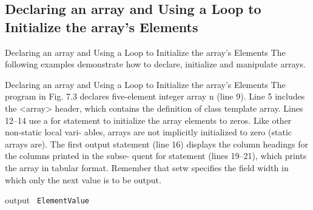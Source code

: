 \documentclass[10pt]{beamer}
\begin{document}
\subsection{Declaring an array and Using a Loop to Initialize the array’s Elements}
\begin{frame}{\footnotesize Declaring an array and Using a Loop to Initialize the array’s Elements}
	The following examples demonstrate how to declare, initialize and manipulate arrays.\\
	
	\begin{block}{\color{white}Declaring an array and Using a Loop to Initialize the array’s Elements}
		The program in Fig. 7.3 declares five-element integer array n (line 9). Line 5 includes the
		<array> header, which contains the definition of class template array. Lines 12–14 use a
		for statement to initialize the array elements to zeros. Like other non-static local vari-
		ables, arrays are not implicitly initialized to zero (static arrays are). The first output
		statement (line 16) displays the column headings for the columns printed in the subse-
		quent for statement (lines 19–21), which prints the array in tabular format. Remember
		that setw specifies the field width in which only the next value is to be output.
	\end{block}
\end{frame}

\begin{frame}{}
	
	\begin{block}{\color{white}output}
		\texttt{\scriptsize 
		Element\:\:\:Value\\
		\:\:\:\:\:\:\:\:\:\:\:\:\:\:\:\:\:\:\:\:\:\:\:\:\:\:0\\
		\:\:\:\:\:\:\:\:\:\:\:\:\:\:\:\:\:\:\:\:\:\:\:\:\:\\
		\:\:\:\:\:\:\:\:\:\:\:\:\:\:\:\:\:\:\:\:\:\:\:\:\:\\
		\:\:\:\:\:\:\:\:\:\:\:\:\:\:\:\:\:\:\:\:\:\:\:\:\:\\
		\:\:\:\:\:\:\:\:\:\:\:\:\:\:\:\:\:\:\:\:\:\:\:\:\:\\}
	\end{block}
\end{frame}
\end{document}

